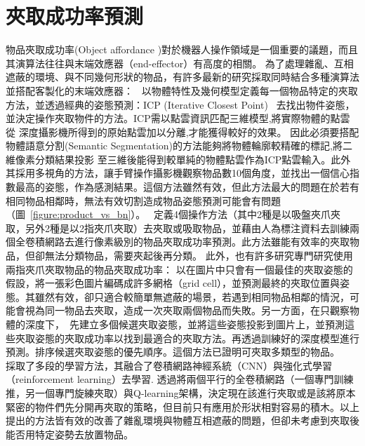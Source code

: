 \section{夾取成功率預測}
物品夾取成功率(Object affordance )對於機器人操作領域是一個重要的議題，而且其演算法往往與末端效應器（end-effector）有高度的相關。
為了處理雜亂、互相遮蔽的環境、與不同幾何形狀的物品，有許多最新的研究採取同時結合多種演算法並搭配客製化的末端效應器：
~\cite{zeng2016multi}以物體特性及幾何模型定義每一個物品特定的夾取方法，並透過經典的姿態預測：ICP
(Iterative Closest Point) ~\cite{pomerleau2013comparing}去找出物件姿態，並決定操作夾取物件的方法。ICP需以點雲資訊匹配三維模型,將實際物體的點雲從
深度攝影機所得到的原始點雲加以分離,才能獲得較好的效果。 因此必須要搭配物體語意分割(Semantic
Segmentation)的方法能夠將物體輪廓較精確的標記,將二維像素分類結果投影
至三維後能得到較單純的物體點雲作為ICP點雲輸入。此外其採用多視角的方法，讓手臂操作攝影機觀察物品數10個角度，並找出一個信心指數最高的姿態，作為感測結果。這個方法雖然有效，但此方法最大的問題在於若有相同物品相鄰時，無法有效切割造成物品姿態預測可能會有問題（圖~\ref{figure:product_vs_bn}）。
~\cite{zeng2018robotic}定義4個操作方法（其中2種是以吸盤夾爪夾取，另外2種是以2指夾爪夾取）去夾取或吸取物品，並藉由人為標注資料去訓練兩個全卷積網路去進行像素級別的物品夾取成功率預測。此方法雖能有效率的夾取物品，但卻無法分類物品，需要夾起後再分類。
此外，也有許多研究專門研究使用兩指夾爪夾取物品的物品夾取成功率： \cite{redmon2015real} 以在圖片中只會有一個最佳的夾取姿態的假設，將一張彩色圖片編碼成許多網格（grid cell），並預測最終的夾取位置與姿態。其雖然有效，卻只適合較簡單無遮蔽的場景，若遇到相同物品相鄰的情況，可能會視為同一物品去夾取，造成一次夾取兩個物品而失敗。另一方面，在只觀察物體的深度下，~\cite{mahler2017dex}先建立多個候選夾取姿態，並將這些姿態投影到圖片上，並預測這些夾取姿態的夾取成功率以找到最適合的夾取方法。再透過訓練好的深度模型進行預測。排序候選夾取姿態的優先順序。這個方法已證明可夾取多類型的物品。
~\cite{pinto2016supersizing} 採取了多段的學習方法，其融合了卷積網路神經系統（CNN）與強化式學習 （reinforcement learning）去學習. \cite{zeng2018learning}透過將兩個平行的全卷積網路（一個專門訓練推，另一個專門旋練夾取）與Q-learning架構，決定現在該進行夾取或是該將原本緊密的物件們先分開再夾取的策略，但目前只有應用於形狀相對容易的積木。以上提出的方法皆有效的改善了雜亂環境與物體互相遮蔽的問題，但卻未考慮到夾取後能否用特定姿勢去放置物品。

